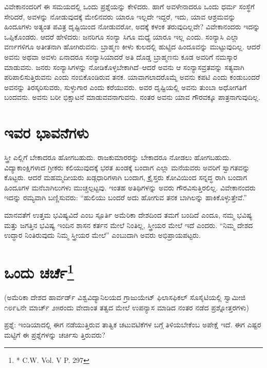 ವಿವೇಕಾನಂದರಿಗೆ ಈ ಸಮಯದಲ್ಲಿ ಒಂದು ಪ್ರಶ್ನೆಯನ್ನು ಕೇಳಿದರು. ಹಾಗೆ ಅವಳೇನಾದರೂ ಒಂದು ಧರ್ಮ ಸಂಸ್ಥೆಗೆ ಸೇರಿದರೆ, ಅವಳನ್ನು ನೋಡುವುದಕ್ಕೆ ಮೇಲಿನವರು ಯಾರೂ ಇಲ್ಲದೇ ಇದ್ದರೆ, ಇದು, ಯಾವ ಆಶ್ರಮವನ್ನು ಹಿಂದೂಗಳು ಅತ್ಯಂತ ಪವಿತ್ರ ದೃಷ್ಟಿಯಿಂದ ನೋಡುವರೋ, ಅದಕ್ಕೆ ಕಳಂಕ ತರುವುದಿಲ್ಲವೇ? ವಿವೇಕಾನಂದರು ಇದನ್ನು ಒಪ್ಪಿಕೊಂಡರು. ಆದರೆ ಹೇಳಿದರು: ಜನರಿಗೂ ಸಂನ್ಯಾ ಸಿಗೂ ಮಧ್ಯೆ ಯಾರೂ ಇಲ್ಲ ಎಂದು. ಸಂನ್ಯಾಸಿ ಎಲ್ಲಾ ವರ್ಣಗಳಿಗೂ ಅತೀತನಾಗಿ ಹೋಗಿರುವನು. ಬ್ರಾಹ್ಮಣ ಕೀಳು ಕುಲದಲ್ಲಿ ಹುಟ್ಟಿದ ಹಿಂದೂವನ್ನು ಮುಟ್ಟುವುದಿಲ್ಲ. ಆದರೆ ಅವನು ಅಥವಾ ಅವಳು ಏನಾದರೂ ಸಂನ್ಯಾಸಿಯಾದರೆ ಅತಿ ದೊಡ್ಡ ಬ್ರಾಹ್ಮಣನು ಕೂಡ ಅವರಿಗೆ ನಮಸ್ಕಾರ ಮಾಡುವನು. ಜನರು ಸಂನ್ಯಾಸಿಗಳನ್ನು ನೋಡಿಕೊಳ್ಳಬೇಕಾಗಿದೆ–ಆದರೆ ಅವನು ಆ ಸಂನ್ಯಾಸವ್ರತವನ್ನು ಸತ್ಯವಾಗಿ ಪರಿಪಾಲಿಸುತ್ತಿರುವನು ಎಂದು ನಂಬಿಕೊಂಡಿರುವ ತನಕ. ಯಾವಾಗಲಾದರೊಮ್ಮೆ ಅವನು ಕಪಟಿ ಎಂದು ಕಂಡುಬಂದರೆ ಅವನನ್ನು ತಿರಸ್ಕರಿಸುವರು, ಸುಳ್ಳುಗಾರ ಎಂದು ಕರೆಯುವರು. ಅವರ ದೃಷ್ಟಿಯಲ್ಲಿ ಅವನು ತುಂಬಾ ಅಧೋಗತಿಗೆ ಬಂದವನು. ಅವನು ಬರೀ ಭಿಕ್ಷಾಟನೆ ಮಾಡುವವನಾಗುವನು. ನಂತರ ಅವನು ಯಾವ ಗೌರವಕ್ಕೂ ಪಾತ್ರನಾಗುವುದಿಲ್ಲ.


\section{ಇವರ ಭಾವನೆಗಳು}

ಸ್ತ್ರೀ ಎಲ್ಲಿಗೆ ಬೇಕಾದರೂ ಹೋಗಬಹುದು. ರಾಜಕುಮಾರರನ್ನು ಬೇಕಾದರೂ ನೋಡಲು ಹೋಗಬಹುದು. ವಿದ್ಯಾಕಾಂಕ್ಷಿಗಳಾದ ಗ್ರೀಕರು ಕಲಿಯುವುದಕ್ಕೆ ಭರತ ಖಂಡಕ್ಕೆ ಬಂದಾಗ ಎಲ್ಲಾ ಮನೆಯವರು ಅವರಿಗೆ ಸ್ವಾಗತವನ್ನು ಕೊಟ್ಟರು. ಆದರೆ ಮಹಮ್ಮದೀಯರು ಖಡ್ಗಧಾರಿಗಳಾಗಿ ಬಂದಾಗ, ಕ್ರೈಸ್ತರು ಕೋವಿಯಿಂದ ಸನ್ನದ್ಧ ರಾಗಿ ಬಂದಾಗ ಹಿಂದೂಗಳ ಮನೆಬಾಗಿಲುಗಳು ಮುಚ್ಚಲ್ಪಟ್ಟವು. ಇಂತಹ ಅತಿಥಿಗಳನ್ನು ಅವರು ಗೌರವಿಸುತ್ತಿರಲಿಲ್ಲ. ವಿವೇಕಾನಂದರು ಇದನ್ನು ರಮ್ಯವಾಗಿ ಬಣ್ಣಿಸುವರು: “ಹುಲಿಯು ಬಂದರೆ ಅದು ಹೋಗುವ ತನಕ ಬಾಗಿಲನ್ನು ಹಾಕಿಕೊಳ್ಳುತ್ತೇವೆ.”

ಮಾನವತೆಗೆ ಉತ್ತಮ ಭವಿಷ್ಯವಿದೆ ಎಂಬ ಸ್ಪೂರ್ತಿ ಅಮೆರಿಕಾ ದೇಶದಿಂದ ತಮಗೆ ಬಂದಿದೆ ಎಂದೂ, ನಮ್ಮ ಭವಿಷ್ಯ ಮತ್ತು ಜಗತ್ತಿನ ಭವಿಷ್ಯ ಇಂದಿನ ಶಾಸನ ಕರ್ತನ ಮೇಲೆ ನಿಂತಿಲ್ಲ, ಸ್ತ್ರೀಯರ ಮೇಲೆ ಇದೆ ಎಂದರು. “ನಿಮ್ಮ ದೇಶದ ಉದ್ಧಾರ ನಿಂತಿರುವುದು ನಿಮ್ಮ ಸ್ತ್ರೀಯರ ಮೇಲೆ” ಎಂಬುದಾಗಿ ಅವರು ಅಭಿಪ್ರಾಯಪಟ್ಟರು.


\section[ಒಂದು ಚರ್ಚೆ]{ಒಂದು ಚರ್ಚೆ\protect\footnote{* C.W. Vol. V P. 297}}

\begin{center}
(ಅಮೆರಿಕಾ ದೇಶದ ಹಾರ್ವರ್ಡ್​ ವಿಶ್ವವಿದ್ಯಾನಿಲಯದ ಗ್ರಾಜುಯೇಟ್​ ಫಿಲಾಸಫಿಕಲ್​ ಸೊಸೈಟಿಯಲ್ಲಿ ಸ್ವಾಮೀಜಿ ೧೮೯೬ನೇ ಮಾರ್ಚ್​ ೨೫ರಂದು ವೇದಾಂತ ತತ್ವದ ಮೇಲೆ ಉಪನ್ಯಾಸ ಮಾಡಿದ ನಂತರ ನಡೆದ ಪ್ರಶ್ನೋತ್ತರಗಳು)
\end{center}

ಪ್ರಶ್ನೆ: ಇಂಡಿಯಾದಲ್ಲಿ ಈಗ ನಡೆಯುತ್ತಿರುವ ತಾತ್ವಿಕ ಚಟುವಟಿಕೆಗಳ ಬಗ್ಗೆ ತಿಳಿಯಬೇಕೆಂಬ ಅಪೇಕ್ಷೆ ಇದೆ. ಈಗ ಎಷ್ಟರ ಮಟ್ಟಿಗೆ ಈ ಪ್ರಶ್ನೆಗಳನ್ನು ಚರ್ಚಿಸು ತ್ತಿರುವರು?

